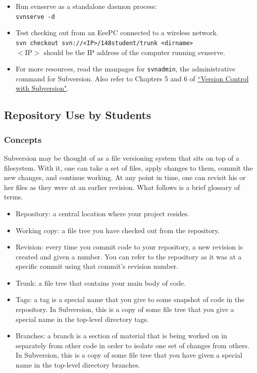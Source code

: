 \begin{itemize}
\item Run svnserve as a standalone daemon process:\\
\texttt{svnserve -d}

\item Test checking out from an EeePC connected to a wireless network.\\
\texttt{svn checkout svn://<IP>/148student/trunk <dirname>}\\
$<$IP$>$ should be the IP address of the computer running svnserve.

\item For more resources, read the manpages for \texttt{svnadmin}, the administrative command for Subversion. Also refer to Chapters 5 and 6 of \href{http://svnbook.red-bean.com/en/1.5/index.html}{``Version Control with Subversion"}.

\end{itemize}

\subsection{Repository Use by Students}

\subsubsection{Concepts}

Subversion may be thought of as a file versioning system that sits on top of a filesystem. With it, one can take a set of files, apply changes to them, commit the new changes, and continue working. At any point in time, one can revisit his or her files as they were at an earlier revision. What follows is a brief glossary of terms.

\begin{itemize}
\item Repository: a central location where your project resides.
\item Working copy: a file tree you have checked out from the repository.
\item Revision: every time you commit code to your repository, a new revision is created and given a number. You can refer to the repository as it was at a specific commit using that commit's revision number.
\item Trunk: a file tree that contains your main body of code.
\item Tags: a tag is a special name that you give to some snapshot of code in the repository. In Subversion, this is a copy of some file tree that you give a special name in the top-level directory tags.
\item Branches: a branch is a section of material that is being worked on in separately from other code in order to isolate one set of changes from others. In Subversion, this is a copy of some file tree that you have given a special name in the top-level directory branches. 
\end{itemize}


